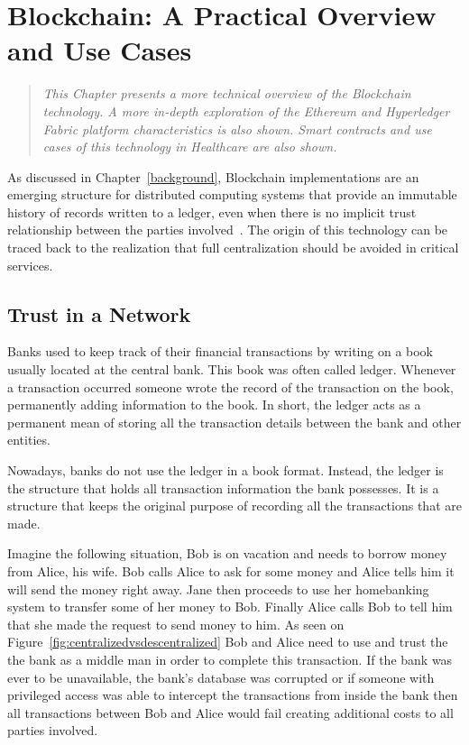 \chapter{Blockchain: A Practical Overview and Use Cases}\label{blockchain}

\begin{quote} 
  \emph{This Chapter presents a more technical overview of the Blockchain
  technology. A more in-depth exploration of the Ethereum and Hyperledger
  Fabric platform characteristics is also shown. Smart contracts and use cases
  of this technology in Healthcare are also shown.}
\end{quote}

As discussed in Chapter~\ref{background}, Blockchain implementations are an
emerging structure for distributed computing systems that provide an immutable
history of records written to a ledger, even when there is no implicit trust
relationship between the parties involved~\cite{Barclay2017}. The origin of
this technology can be traced back to the realization that full centralization
should be avoided in critical services.

\section{Trust in a Network}

Banks used to keep track of their financial transactions by writing on a book
usually located at the central bank. This book was often called ledger.
Whenever a transaction occurred someone wrote the record of the transaction on
the book, permanently adding information to the book. In short, the ledger acts
as a permanent mean of storing all the transaction details between the bank and
other entities. 

Nowadays, banks do not use the ledger in a book format. Instead, the ledger is
the structure that holds all transaction information the bank possesses. It is
a structure that keeps the original purpose of recording all the transactions
that are made.

Imagine the following situation, Bob is on vacation and needs to borrow money
from Alice, his wife. Bob calls Alice to ask for some money and Alice tells him
it will send the money right away. Jane then proceeds to use her homebanking
system to transfer some of her money to Bob. Finally Alice calls Bob to tell
him that she made the request to send money to him.  As seen on
Figure~\ref{fig:centralizedvsdescentralized} Bob and Alice need to use and
trust the the bank as a middle man in order to complete this transaction. If
the bank was ever to be unavailable, the bank's database was corrupted or if
someone with  privileged access was able to intercept the transactions from
inside the bank then all transactions between Bob and Alice would fail creating
additional costs to all parties involved. 

